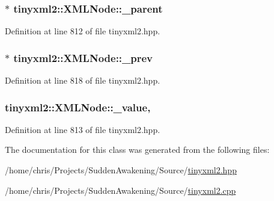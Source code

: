 \hypertarget{classtinyxml2_1_1_x_m_l_node_a176dd1c4965c21c366de192164aa2c13}{
\subsubsection[{\-\_\-parent}]{$\ast$ tinyxml2\-::\-X\-M\-L\-Node\-::\-\_\-parent\hspace{0.3cm}{\ttfamily [protected]}}}\label{classtinyxml2_1_1_x_m_l_node_a176dd1c4965c21c366de192164aa2c13}


Definition at line 812 of file tinyxml2.\-hpp.

\hypertarget{classtinyxml2_1_1_x_m_l_node_a9739eb0fb9a1188266052055e7a6bf6b}{
\subsubsection[{\-\_\-prev}]{$\ast$ tinyxml2\-::\-X\-M\-L\-Node\-::\-\_\-prev\hspace{0.3cm}{\ttfamily [protected]}}}\label{classtinyxml2_1_1_x_m_l_node_a9739eb0fb9a1188266052055e7a6bf6b}


Definition at line 818 of file tinyxml2.\-hpp.

\hypertarget{classtinyxml2_1_1_x_m_l_node_a3ea9884098b8379de2bb5ab3fc85c0fc}{
\subsubsection[{\-\_\-value}]{ tinyxml2\-::\-X\-M\-L\-Node\-::\-\_\-value\hspace{0.3cm}{\ttfamily [mutable]}, {\ttfamily [protected]}}}\label{classtinyxml2_1_1_x_m_l_node_a3ea9884098b8379de2bb5ab3fc85c0fc}


Definition at line 813 of file tinyxml2.\-hpp.



The documentation for this class was generated from the following files\-:\begin{DoxyCompactItemize}
\item 
/home/chris/\-Projects/\-Sudden\-Awakening/\-Source/\hyperlink{tinyxml2_8hpp}{tinyxml2.\-hpp}\item 
/home/chris/\-Projects/\-Sudden\-Awakening/\-Source/\hyperlink{tinyxml2_8cpp}{tinyxml2.\-cpp}\end{DoxyCompactItemize}
